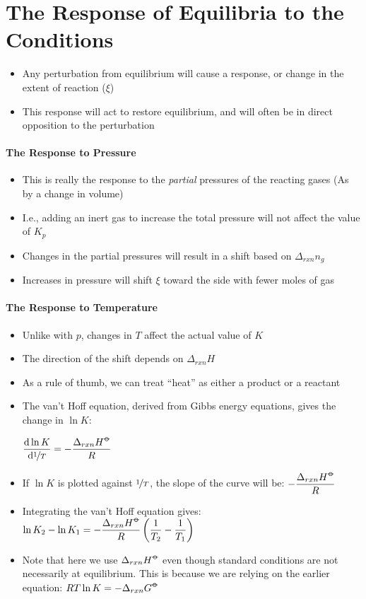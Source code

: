 \documentclass[12pt, openany, letterpaper]{memoir}
\begin{document}
\section{The Response of Equilibria to the Conditions}
\begin{itemize}
	\item Any perturbation from equilibrium will cause a response, or change in the extent of reaction ($\xi$)
	\item This response will act to restore equilibrium, and will often be in direct opposition to the perturbation
\end{itemize}
\paragraph{The Response to Pressure}
\begin{itemize}
	\item This is really the response to the \emph{partial} pressures of the reacting gases (As by a change in volume)
	\item I.e., adding an inert gas to increase the total pressure will not affect the value of $K_{p}$
	\item Changes in the partial pressures will result in a shift based on $\Delta_{rxn}n_{g}$
	\item Increases in pressure will shift $\xi$ toward the side with fewer moles of gas
\end{itemize}
\paragraph{The Response to Temperature}
\begin{itemize}
	\item Unlike with $p$, changes in $T$ affect the actual value of $K$
	\item The direction of the shift depends on $\Delta_{rxn}H$
	\item As a rule of thumb, we can treat “heat” as either a product or a reactant
	\item The van't Hoff equation, derived from Gibbs energy equations, gives the change in $\ln K$:
	
	$\dfrac{\mathrm{d}\ln K}{\mathrm{d}\nicefrac{1}{T}} = -\dfrac{\Delta_{rxn}H^{\std}}{R}$
	\item If $\ln K$ is plotted against $\nicefrac{1}{T}$, the slope of the curve will be: $-\dfrac{\Delta_{rxn}H^{\std}}{R}$
	\item Integrating the van't Hoff equation gives: $\ln K_2 - \ln K_1 = -\dfrac{\Delta_{rxn}H^{\std}}{R}\left(\dfrac{1}{T_2}-\dfrac{1}{T_1}\right)$
	\item Note that here we use $\Delta_{rxn}H^{\std}$ even though standard conditions are not necessarily at equilibrium. This is because we are relying on the earlier equation: $RT\ln K = -\Delta_{rxn}G^{\std}$
\end{itemize}
\end{document}
